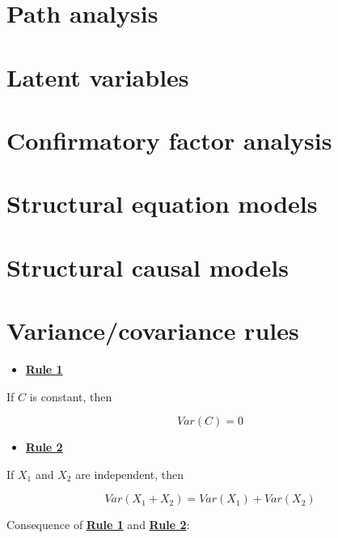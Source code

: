 \documentclass[
]{book}
\providecommand{\tightlist}{%
  \setlength{\itemsep}{0pt}\setlength{\parskip}{0pt}}
\begin{document}
\hypertarget{path}{%
\chapter{Path analysis}\label{path}}

\hypertarget{latent}{%
\chapter{Latent variables}\label{latent}}

\hypertarget{cfa}{%
\chapter{Confirmatory factor analysis}\label{cfa}}

\hypertarget{sem}{%
\chapter{Structural equation models}\label{sem}}

\hypertarget{scm}{%
\chapter{Structural causal models}\label{scm}}

\hypertarget{appendix-appendix}{%
\appendix}


\hypertarget{appendix-rules}{%
\chapter{Variance/covariance rules}\label{appendix-rules}}

\begin{itemize}
\tightlist
\item
  \href{./variance.html\#Rule1}{\textbf{Rule 1}}
\end{itemize}

If \(C\) is constant, then

\[
Var\left(C\right) = 0
\]

\begin{itemize}
\tightlist
\item
  \href{./variance.html\#Rule2}{\textbf{Rule 2}}
\end{itemize}

If \(X_{1}\) and \(X_{2}\) are independent, then

\[
Var\left(X_{1} + X_{2}\right) =
Var\left(X_{1}\right) + Var\left(X_{2}\right)
\]

Consequence of \href{./variance.html\#Rule1}{\textbf{Rule 1}} and \href{./variance.html\#Rule2}{\textbf{Rule 2}}:
\end{document}
